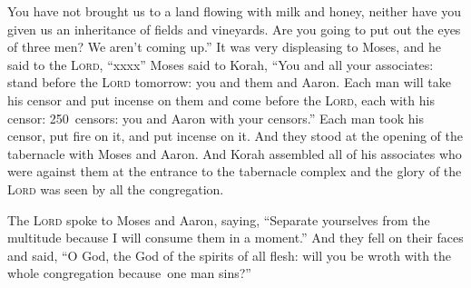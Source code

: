 \begin{inparaenum}
     You have not brought us to a land flowing with milk and honey, neither have you given us an inheritance of fields and vineyards. Are you going to put out the eyes of three men? We aren't coming up.''%
     It was very displeasing to Moses, and he said to the \textsc{Lord}, ``xxxx''%
     Moses said to Korah, ``You and all your associates: stand before the \textsc{Lord} tomorrow: you and them and Aaron.%
     Each man will take his censor and put incense on them and come before the \textsc{Lord}, each with his censor: 250~censors: you and Aaron with your censors.''%
     Each man took his censor, put fire on it, and put incense on it. And they stood at the opening of the tabernacle with Moses and Aaron.%
     And Korah assembled all of his associates who were against them at the entrance to the tabernacle complex and the glory of the \textsc{Lord} was seen by all the congregation.%
    
     The \textsc{Lord} spoke to Moses and Aaron, saying,%
     ``Separate yourselves from the multitude because I will consume them in a moment.''%
     And they fell on their faces and said, ``O God, the God of the spirits of all flesh: will you be wroth with the whole congregation because\understood\ one man sins?''%
    

\end{inparaenum}
